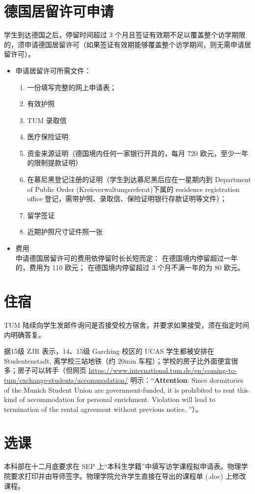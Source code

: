 \documentclass{article}
\begin{document}
\section{德国居留许可申请}
学生到达德国之后，停留时间超过 3 个月且签证有效期不足以覆盖整个访学期限的，须申请德国居留许可（如果签证有效期能够覆盖整个访学期间，则无需申请居留许可）。
\begin{itemize}
\item 申请居留许可所需文件：
\begin{enumerate}
\item 一份填写完整的网上申请表；
\item 有效护照
\item TUM 录取信
\item 医疗保险证明
\item 资金来源证明（德国境内任何一家银行开具的，每月 720 欧元，至少一年的限制提款证明）
\item 在慕尼黑登记注册的证明（学生到达慕尼黑后应在一星期内到 Department of Public Order (Kreisverwaltungsreferat)下属的 residence registration office 登记，需带护照、录取信、保险证明银行存款证明等文件）；
\item 留学签证
\item 近期护照尺寸证件照一张
\end{enumerate}
\item 费用\\
申请德国居留许可的费用依停留时长长短而定：
在德国境内停留超过一年的，费用为 110 欧元；
在德国境内停留超过 3 个月不满一年的为 80 欧元。
\end{itemize}

\section{住宿}
TUM 陆续向学生发邮件询问是否接受校方宿舍，并要求如果接受，须在指定时间内明确答复。

据15级 ZJR 表示，14、15级 Garching 校区的 UCAS 学生都被安排在 Studentenstadt, 离学校三站地铁（约 20min 车程）；学校的房子比外面便宜很多；房子可以转手（但网页 \url{https://www.international.tum.de/en/coming-to-tum/exchange-students/accommodation/} 明示：``\textbf{Attention}: Since dormitories of the Munich Student Union are government-funded, it is prohibited to rent this kind of accommodation for personal enrichment. Violation will lead to termination of the rental agreement without previous notice. ''）。

\section{选课}
本科部在十二月底要求在 SEP 上“本科生学籍”中填写访学课程拟申请表。物理学院要求打印并由导师签字。物理学院允许学生直接在导出的课程单 (.doc) 上修改课程。
\end{document}
